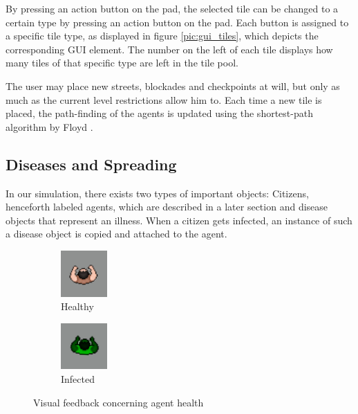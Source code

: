 \documentclass[table]{sig-alternate-05-2015}
\begin{document}
By pressing an action button on the pad, the selected tile can be changed to a certain type by pressing an action button on the pad.
Each button is assigned to a specific tile type, as displayed in figure \ref{pic:gui_tiles}, which depicts the corresponding GUI element. The number on the left of each tile displays how many tiles of that specific type are left in the tile pool.

The user may place new streets, blockades and checkpoints at will, but only as much as the current level restrictions allow him to. Each time a new tile is placed, the path-finding of the agents is updated using the shortest-path algorithm by Floyd \cite{floyd}.

\subsection{Diseases and Spreading}
\label{sec:diseases}

In our simulation, there exists two types of important objects: Citizens, henceforth labeled agents, which are described in a later section and disease objects that represent an illness. When a citizen gets infected, an instance of such a disease object is copied and attached to the agent.

\begin{figure}[h]
\begin{center}
\begin{subfigure}{0.2\textwidth}
\begin{center}
\includegraphics[width = 50pt]{Pictures/human.png}
\caption{Healthy}
\end{center}
\end{subfigure}
\begin{subfigure}{0.2\textwidth}
\begin{center}
\includegraphics[width = 50pt]{Pictures/infected.png}
\caption{Infected}
\end{center}
\end{subfigure}
\caption{Visual feedback concerning agent health}
\label{fig:infected}
\end{center}
\end{figure}
\end{document}
